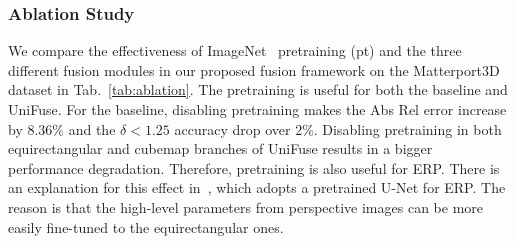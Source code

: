 \documentclass[letterpaper, 10 pt, conference]{ieeeconf}
\begin{document}
\subsubsection{Ablation Study}


\begin{table}[t]
\vspace{6pt}
  \centering
\caption{\textbf{Ablation Study.}}
\label{tab:ablation}
\end{table}

We compare the effectiveness of { ImageNet~\cite{deng2009imagenet} pretraining (pt) and} the three different fusion modules in our proposed fusion framework on the Matterport3D dataset in Tab.~\ref{tab:ablation}. 
{The pretraining is useful for both the baseline and UniFuse. For the baseline, disabling pretraining makes the Abs Rel error increase by $8.36\%$ and the $\delta<1.25$ accuracy drop over $2\%$. Disabling pretraining in both equirectangular and cubemap branches of  UniFuse results in a bigger performance degradation. Therefore, pretraining is also useful for ERP. There is an explanation for this effect in~\cite{jin2020geometric}, which adopts a pretrained U-Net for ERP. The reason is that the high-level parameters from perspective images can be more easily fine-tuned to the equirectangular ones.} 
\end{document}
